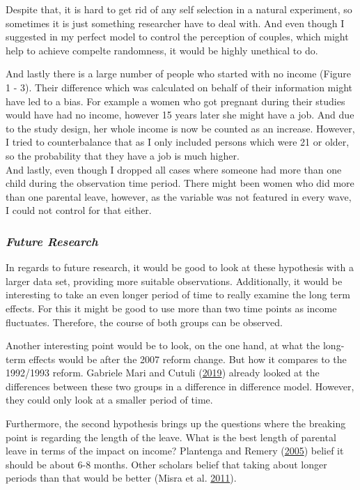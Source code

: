 \documentclass[
  12pt,
]{article}
\begin{document}
Despite that, it is hard to get rid of any self selection in a natural experiment, so sometimes it is just something researcher have to deal with.
And even though I suggested in my perfect model to control the perception of couples, which might help to achieve compelte randomness, it would be highly unethical to do.

And lastly there is a large number of people who started with no income (Figure 1 - 3). Their difference which was calculated on behalf of their information might have led to a bias. For example a women who got pregnant during their studies would have had no income, however 15 years later she might have a job.
And due to the study design, her whole income is now be counted as an increase. However, I tried to counterbalance that as I only included persons which were 21 or older, so the probability that they have a job is much higher.\\
And lastly, even though I dropped all cases where someone had more than one child during the observation time period. There might been women who did more than one parental leave, however, as the variable was not featured in every wave, I could not control for that either.

\hypertarget{future-research}{%
\subsubsection*{\texorpdfstring{\emph{Future Research}}{Future Research}}\label{future-research}}

In regards to future research, it would be good to look at these hypothesis with a larger data set, providing more suitable observations. Additionally, it would be interesting to take an even longer period of time to really examine the long term effects. For this it might be good to use more than two time points as income fluctuates. Therefore, the course of both groups can be observed.

Another interesting point would be to look, on the one hand, at what the long-term effects would be after the 2007 reform change. But how it compares to the 1992/1993 reform.
Gabriele Mari and Cutuli (\protect\hyperlink{ref-gabriele_mari_parental_2019}{2019}) already looked at the differences between these two groups in a difference in difference model. However, they could only look at a smaller period of time.

Furthermore, the second hypothesis brings up the questions where the breaking point is regarding the length of the leave. What is the best length of parental leave in terms of the impact on income? Plantenga and Remery (\protect\hyperlink{ref-plantenga_reconciliation_2005}{2005}) belief it should be about 6-8 months. Other scholars belief that taking about longer periods than that would be better (Misra et al. \protect\hyperlink{ref-misra_work-family_2011}{2011}).
\end{document}
